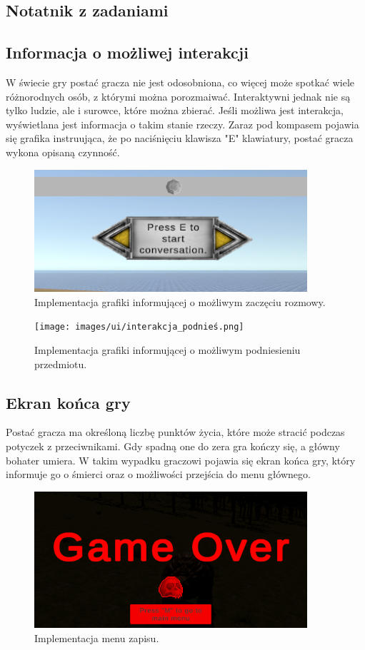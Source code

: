 \subsection{Notatnik z zadaniami}


\subsection{Informacja o możliwej interakcji}
W świecie gry postać gracza nie jest odosobniona, co więcej może spotkać wiele różnorodnych osób, z którymi można porozmaiwać. Interaktywni
jednak nie są tylko ludzie, ale i surowce, które można zbierać. Jeśli możliwa jest interakcja,  wyświetlana jest informacja o takim stanie
 rzeczy. Zaraz pod kompasem pojawia się grafika instruująca, że po naciśnięciu klawisza "E" klawiatury, postać gracza wykona opisaną czynność.
 \begin{figure}[htbp]
    \centering
    \includegraphics[width=0.9\textwidth]{images/ui/interakcja_rozmowa.png}
    \caption{Implementacja grafiki informującej o możliwym zaczęciu rozmowy.}\label{fig:rozmow}
\end{figure}
\begin{figure}[htbp]
    \centering
    \texttt{[image: images/ui/interakcja\_podnieś.png]}
    \caption{Implementacja grafiki informującej o możliwym podniesieniu przedmiotu.}\label{fig:przedmio}
\end{figure}

\subsection{Ekran końca gry}
Postać gracza ma określoną liczbę punktów życia, które może stracić podczas potyczek z przeciwnikami. Gdy spadną one do zera gra kończy się, a główny bohater umiera.
W takim wypadku graczowi pojawia się ekran końca gry, który informuje go o śmierci oraz o możliwości przejścia do menu głównego.
\begin{figure}[htbp]
    \centering
    \includegraphics[width=0.9\textwidth]{images/ui/endgame_screen.png}
    \caption{Implementacja menu zapisu.}\label{fig:end_sc}
\end{figure}
